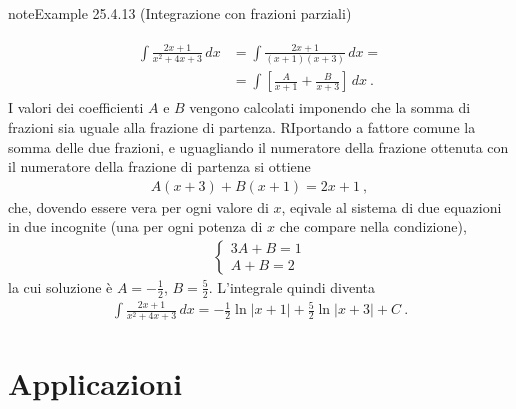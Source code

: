\documentclass[letterpaper,10pt,italian]{jupyterBook}
\begin{document}
\begin{sphinxadmonition}{note}{Example 25.4.13 (Integrazione con frazioni parziali)}


\begin{equation*}
\begin{split}\begin{aligned}
  \int \frac{2x + 1}{x^2 + 4x + 3} \, dx 
  & = \int \frac{2x + 1}{(x+1)(x+3)} \, dx= \\
  & = \int \left[ \frac{A}{x+1} + \frac{B}{x+3} \right] \, dx \ .
\end{aligned}\end{split}
\end{equation*}
\sphinxAtStartPar
I valori dei coefficienti \(A\) e \(B\) vengono calcolati imponendo che la somma di frazioni sia uguale alla frazione di partenza. RIportando a fattore comune la somma delle due frazioni, e uguagliando il numeratore della frazione ottenuta con il numeratore della frazione di partenza si ottiene
\begin{equation*}
\begin{split}A (x+3) + B(x+1) = 2x + 1 \ ,\end{split}
\end{equation*}
\sphinxAtStartPar
che, dovendo essere vera per ogni valore di \(x\), eqivale al sistema di due equazioni in due incognite (una per ogni potenza di \(x\) che compare nella condizione),
\begin{equation*}
\begin{split}\begin{cases}
  3 A + B = 1 \\
  A + B = 2
\end{cases}\end{split}
\end{equation*}
\sphinxAtStartPar
la cui soluzione è \(A = -\frac{1}{2}\), \(B = \frac{5}{2}\). L’integrale quindi diventa
\begin{equation*}
\begin{split}\int \frac{2x + 1}{x^2 + 4x + 3} \, dx= -\frac{1}{2} \ln |x+1| + \frac{5}{2} \ln |x + 3| + C \ .\end{split}
\end{equation*}\end{sphinxadmonition}


\section{Applicazioni}
\label{\detokenize{ch/infinitesimal_calculus/integrals:applicazioni}}\label{\detokenize{ch/infinitesimal_calculus/integrals:infinitesimal-calculus-integrals-applications}}
\end{document}
